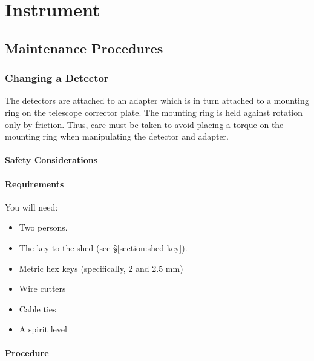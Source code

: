 
\chapter{Instrument}

\section{Maintenance Procedures}

\subsection{Changing a Detector}

The detectors are attached to an adapter which is in turn attached to a mounting ring on the telescope corrector plate. The mounting ring is held against rotation only by friction. Thus, care must be taken to avoid placing a torque on the mounting ring when manipulating the detector and adapter.

\subsubsection{Safety Considerations}
\label{section:changing-a-detector}



\subsubsection{Requirements}

You will need:

\begin{itemize}
\item Two persons.
\item The key to the shed (see \S\ref{section:shed-key}).
\item Metric hex keys (specifically, 2 and 2.5 mm)
\item Wire cutters
\item Cable ties
\item A spirit level
\end{itemize}

\subsubsection{Procedure}

